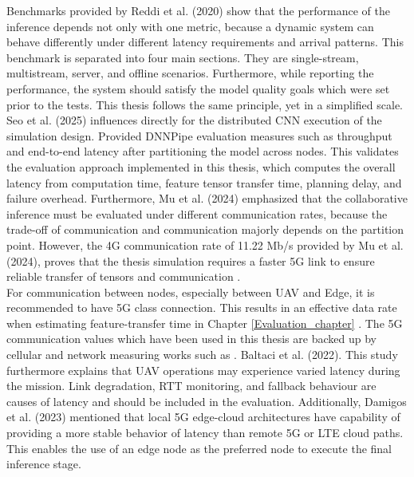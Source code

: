 Benchmarks provided by Reddi et al. (2020) show that the performance of the inference depends not only with one metric, because a dynamic system can behave differently under different latency requirements and arrival patterns. This benchmark is separated into four main sections. They are single-stream, multistream, server, and offline scenarios. Furthermore, while reporting the performance, the system should satisfy the model quality goals which were set prior to the tests\cite{MLPerfInf2020Reddi}. This thesis follows the same principle, yet in a simplified scale. \\

Seo et al. (2025) influences directly for the distributed CNN execution of the simulation design. Provided DNNPipe evaluation measures such as throughput and end-to-end latency after partitioning the model across nodes\cite{Seo2025DNNPipe}. This validates the evaluation approach implemented in this thesis, which computes the overall latency from computation time, feature tensor transfer time, planning delay, and failure overhead. Furthermore, Mu et al. (2024) emphasized that the collaborative inference must be evaluated under different communication rates, because the trade-off of communication and communication majorly depends on the partition point. However, the 4G communication rate of 11.22 Mb/s provided by Mu et al. (2024), proves that the thesis simulation requires a faster 5G link to ensure reliable transfer of tensors and communication \cite{Mu2024FineGrain}. \\

For communication between nodes, especially between UAV and Edge, it is recommended to have 5G class connection. This results in an effective data rate when estimating feature-transfer time in Chapter \ref{Evaluation_chapter} \cite{rochman2024comprehensive}. The 5G communication values which have been used in this thesis are backed up by cellular and network measuring works such as . Baltaci et al. (2022). This study furthermore explains that UAV operations may experience varied latency during the mission. Link degradation, RTT monitoring, and fallback behaviour are causes of latency and should be included in the evaluation\cite{AnalyzingVideoDelivery2022Baltaci}. Additionally, Damigos et al. (2023) mentioned that local 5G edge-cloud architectures have capability of providing a more stable behavior of latency than remote 5G or LTE cloud paths. This enables the use of an edge node as the preferred node to execute the final inference stage\cite{Damigos2023Toward5GEdgeUAV}. \\


